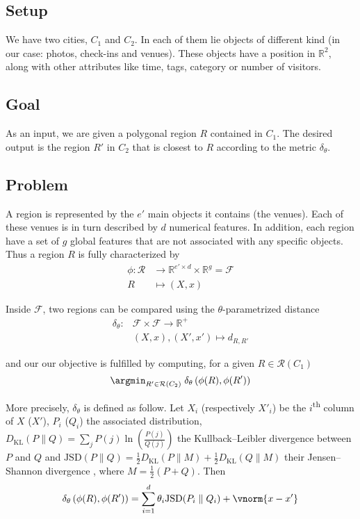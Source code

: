 \subsection*{Setup}
We have two cities, $C_1$ and $C_2$. In each of them lie objects of different
kind (in our case: photos, check-ins and venues). These objects have a
position in $\mathbb{R}^2$, along with other attributes like time, tags,
category or number of visitors.

\subsection*{Goal}

As an input, we are given a polygonal region $R$ contained in $C_1$. The
desired output is the region $R'$ in $C_2$ that is closest to $R$ according
to the metric $\delta_{\theta}$.

\subsection*{Problem}

A region is represented by the $e'$ main objects it contains (the venues).
Each of these venues is in turn described by $d$ numerical features. In
addition, each region have a set of $g$ global features that are not
associated with any specific objects. Thus a region $R$ is fully characterized
by
\begin{align*}
	\phi \colon \mathcal{R} &\to
	\mathbb{R}^{e'\times d} \times \mathbb{R}^g = \mathcal{F} \\
	R &\mapsto (X, x)
\end{align*}

Inside $\mathcal{F}$, two regions can be compared using the
$\theta$-parametrized distance
\begin{align*}
	\delta_{\theta} \colon &\mathcal{F} \times \mathcal{F} \to
	\mathbb{R}^+ \\
	&(X, x) , (X', x') \mapsto d_{R,R'}
\end{align*}

and our our objective is fulfilled by computing, for a given $R \in
\mathcal{R}(C_1)$
\begin{equation}
	\argmin_{R' \in \mathcal{R}(C_2)}\; \delta_{\theta}
	\left(\phi(R), \phi(R')\right)
	\label{e:onetheta}
\end{equation}

More precisely, $\delta_{\theta}$ is defined as follow. Let $X_i$ (respectively
$X'_i$) be the $i$\textsuperscript{th} column of $X$ ($X'$), $P_i$ ($Q_i$) the
associated distribution, $D_{\mathrm{KL}}(P \parallel Q) = \sum_j
P(j)\ln\left(\frac{P(j)}{Q(j)}\right)$ the Kullback--Leibler divergence
between $P$ and $Q$ and $ \mathrm{JSD}(P \parallel Q)=
\frac{1}{2}D_{\mathrm{KL}}(P \parallel M)+\frac{1}{2}D_{\mathrm{KL}}(Q
\parallel M)$ their Jensen--Shannon divergence \autocite{JensenShannon03},
where $M=\frac{1}{2}(P+Q)$. Then
\[
	\delta_{\theta} \left(\phi(R), \phi(R')\right) = \sum_{i=1}^d
	\theta_i \mathrm{JSD}(P_i \parallel Q_i) + \vnorm{x - x'}
\]

